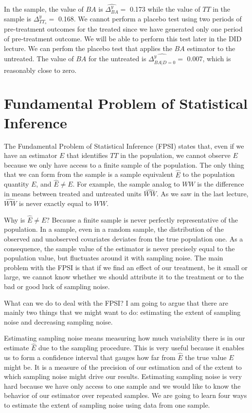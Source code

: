 \documentclass[
]{book}
\theoremstyle{definition}
\theoremstyle{definition}
\theoremstyle{definition}
\theoremstyle{definition}
\theoremstyle{remark}
\begin{document}
In the sample, the value of \(BA\) is \(\hat{\Delta^y_{BA}}=\) 0.173 while the value of \(TT\) in the sample is \(\Delta^y_{TT_s}=\) 0.168.
We cannot perform a placebo test using two periods of pre-treatment outcomes for the treated since we have generated only one period of pre-treatment outcome.
We will be able to perform this test later in the DID lecture.
We can perfom the placebo test that applies the \(BA\) estimator to the untreated.
The value of \(BA\) for the untreated is \(\hat{\Delta^y_{BA|D=0}}=\) 0.007, which is reasonably close to zero.

\hypertarget{FPSI}{%
\chapter{Fundamental Problem of Statistical Inference}\label{FPSI}}

The Fundamental Problem of Statistical Inference (FPSI) states that, even if we have an estimator \(E\) that identifies \(TT\) in the population, we cannot observe \(E\) because we only have access to a finite sample of the population.
The only thing that we can form from the sample is a sample equivalent \(\hat{E}\) to the population quantity \(E\), and \(\hat{E}\neq E\).
For example, the sample analog to \(WW\) is the difference in means between treated and untreated units \(\hat{WW}\).
As we saw in the last lecture, \(\hat{WW}\) is never exactly equal to \(WW\).

Why is \(\hat{E}\neq E\)?
Because a finite sample is never perfectly representative of the population.
In a sample, even in a random sample, the distribution of the observed and unobserved covariates deviates from the true population one.
As a consequence, the sample value of the estimator is never precisely equal to the population value, but fluctuates around it with sampling noise.
The main problem with the FPSI is that if we find an effect of our treatment, be it small or large, we cannot know whether we should attribute it to the treatment or to the bad or good luck of sampling noise.

What can we do to deal with the FPSI?
I am going to argue that there are mainly two things that we might want to do: estimating the extent of sampling noise and decreasing sampling noise.

Estimating sampling noise means measuring how much variability there is in our estimate \(\hat{E}\) due to the sampling procedure.
This is very useful because it enables us to form a confidence interval that gauges how far from \(\hat{E}\) the true value \(E\) might be.
It is a measure of the precision of our estimation and of the extent to which sampling noise might drive our results.
Estimating sampling noise is very hard because we have only access to one sample and we would like to know the behavior of our estimator over repeated samples.
We are going to learn four ways to estimate the extent of sampling noise using data from one sample.
\end{document}
